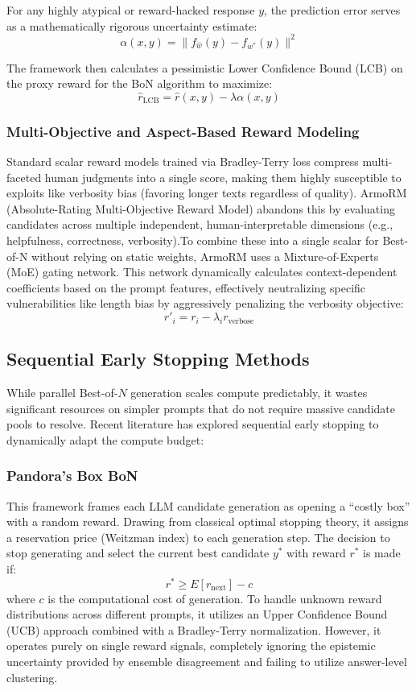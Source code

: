 \documentclass[a4paper,11pt]{article}
\begin{document}
For any highly atypical or reward-hacked response $y$, the prediction error serves as a mathematically rigorous uncertainty estimate:$$\alpha(x, y) = \|f_{\hat{w}}(y) - f_{w^*}(y)\|^2$$

The framework then calculates a pessimistic Lower Confidence Bound (LCB) on the proxy reward for the BoN algorithm to maximize:$$\hat{r}_{\text{LCB}} = \hat{r}(x, y) - \lambda \alpha(x, y)$$

\subsubsection{Multi-Objective and Aspect-Based Reward Modeling}
Standard scalar reward models trained via Bradley-Terry loss compress multi-faceted human judgments into a single score, making them highly susceptible to exploits like verbosity bias (favoring longer texts regardless of quality). ArmoRM \cite{wang2024interpretable} (Absolute-Rating Multi-Objective Reward Model) abandons this by evaluating candidates across multiple independent, human-interpretable dimensions (e.g., helpfulness, correctness, verbosity).To combine these into a single scalar for Best-of-N without relying on static weights, ArmoRM uses a Mixture-of-Experts (MoE) gating network. This network dynamically calculates context-dependent coefficients based on the prompt features, effectively neutralizing specific vulnerabilities like length bias by aggressively penalizing the verbosity objective:$$r'_i = r_i - \lambda_i r_{\text{verbose}}$$


\subsection{Sequential Early Stopping Methods}
While parallel Best-of-$N$ generation scales compute predictably, it wastes significant resources on simpler prompts that do not require massive candidate pools to resolve. Recent literature has explored sequential early stopping to dynamically adapt the compute budget:

\subsubsection{Pandora's Box BoN}
\label{sec:pandora}
This framework \cite{pandora2025} frames each LLM candidate generation as opening a ``costly box'' with a random reward. Drawing from classical optimal stopping theory, it assigns a reservation price (Weitzman index) to each generation step. The decision to stop generating and select the current best candidate $y^*$ with reward $r^*$ is made if:
\begin{equation}
r^* \geq E[r_{\text{next}}] - c
\end{equation}
where $c$ is the computational cost of generation. To handle unknown reward distributions across different prompts, it utilizes an Upper Confidence Bound (UCB) approach combined with a Bradley-Terry normalization. However, it operates purely on single reward signals, completely ignoring the epistemic uncertainty provided by ensemble disagreement and failing to utilize answer-level clustering.
\end{document}
